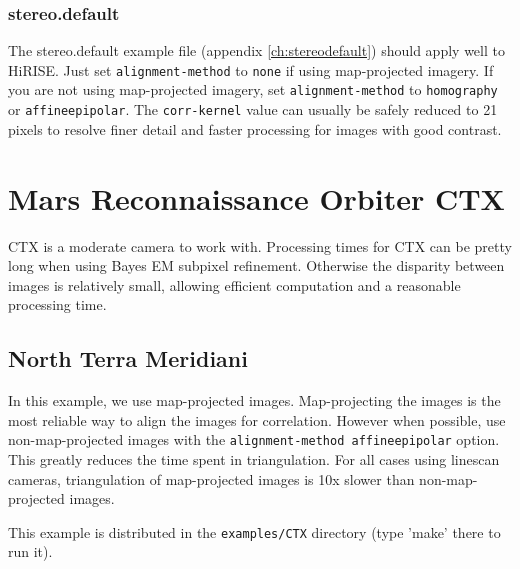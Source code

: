\subsubsection*{stereo.default}

The stereo.default example file (appendix \ref{ch:stereodefault})
should apply well to HiRISE. Just set
\texttt{alignment-method} to \texttt{none} if
using map-projected imagery. If you are not using map-projected
imagery, set \texttt{alignment-method} to \texttt{homography} or
\texttt{affineepipolar}. The \texttt{corr-kernel} value can usually be
safely reduced to 21 pixels to resolve finer detail and faster
processing for images with good contrast.

\vfill

\section{Mars Reconnaissance Orbiter CTX}

\ac{CTX} is a moderate camera to work with. Processing times for
\ac{CTX} can be pretty long when using Bayes EM subpixel
refinement. Otherwise the disparity between images is relatively
small, allowing efficient computation and a reasonable processing time.

\subsection{North Terra Meridiani}


In this example, we use map-projected images. Map-projecting the
images is the most reliable way to align the images for
correlation. However when possible, use non-map-projected images with
the \texttt{alignment-method affineepipolar} option. This greatly reduces
the time spent in triangulation. For all cases using linescan cameras,
triangulation of map-projected images is 10x slower than
non-map-projected images.

This example is distributed in the \texttt{examples/CTX} directory (type
'make' there to run it).

